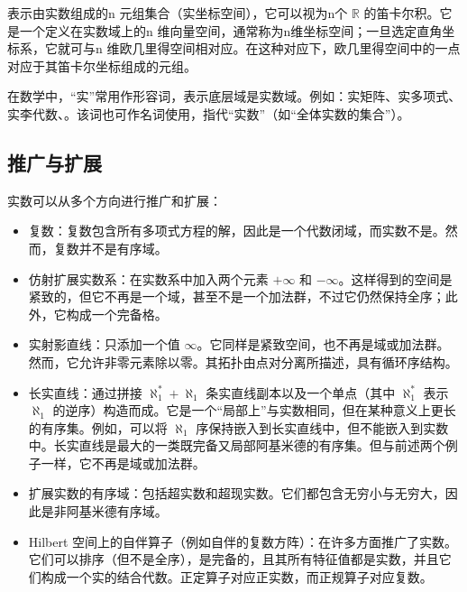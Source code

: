 表示由实数组成的n 元组集合（实坐标空间），它可以视为n个 $\mathbb{R}$ 的笛卡尔积。它是一个定义在实数域上的n 维向量空间，通常称为n维坐标空间；一旦选定直角坐标系，它就可与n 维欧几里得空间相对应。在这种对应下，欧几里得空间中的一点对应于其笛卡尔坐标组成的元组。

在数学中，“实”常用作形容词，表示底层域是实数域。例如：实矩阵、实多项式、实李代数、。该词也可作名词使用，指代“实数”（如“全体实数的集合”）。
\subsection{推广与扩展}
实数可以从多个方向进行推广和扩展：
\begin{itemize}
\item 复数：复数包含所有多项式方程的解，因此是一个代数闭域，而实数不是。然而，复数并不是有序域。
\item 仿射扩展实数系：在实数系中加入两个元素 $+\infty$ 和 $-\infty$。这样得到的空间是紧致的，但它不再是一个域，甚至不是一个加法群，不过它仍然保持全序；此外，它构成一个完备格。
\item 实射影直线：只添加一个值 $\infty$。它同样是紧致空间，也不再是域或加法群。然而，它允许非零元素除以零。其拓扑由点对分离所描述，具有循环序结构。
\item 长实直线：通过拼接 $\aleph_{1}^{*} + \aleph_{1}$ 条实直线副本以及一个单点（其中 $\aleph_{1}^{*}$ 表示 $\aleph_{1}$ 的逆序）构造而成。它是一个“局部上”与实数相同，但在某种意义上更长的有序集。例如，可以将 $\aleph_{1}$ 序保持嵌入到长实直线中，但不能嵌入到实数中。长实直线是最大的一类既完备又局部阿基米德的有序集。但与前述两个例子一样，它不再是域或加法群。
\item 扩展实数的有序域：包括超实数和超现实数。它们都包含无穷小与无穷大，因此是非阿基米德有序域。
\item Hilbert 空间上的自伴算子（例如自伴的复数方阵）：在许多方面推广了实数。它们可以排序（但不是全序），是完备的，且其所有特征值都是实数，并且它们构成一个实的结合代数。正定算子对应正实数，而正规算子对应复数。
\end{itemize}
